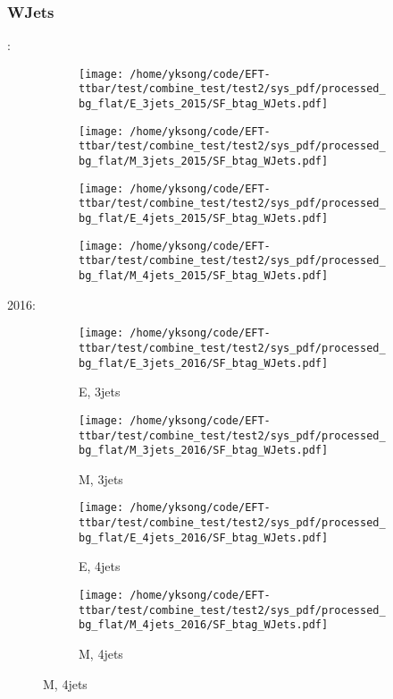 \documentclass{beamer}
\begin{document}
\begin{frame}
\frametitle{WJets}
\fontsize{5}{1}:
\begin{figure}
\centering
\begin{subfigure}[b]{0.24\textwidth}
\texttt{[image: /home/yksong/code/EFT-ttbar/test/combine\_test/test2/sys\_pdf/processed\_bg\_flat/E\_3jets\_2015/SF\_btag\_WJets.pdf]}
\end{subfigure}
\begin{subfigure}[b]{0.24\textwidth}
\texttt{[image: /home/yksong/code/EFT-ttbar/test/combine\_test/test2/sys\_pdf/processed\_bg\_flat/M\_3jets\_2015/SF\_btag\_WJets.pdf]}
\end{subfigure}
\begin{subfigure}[b]{0.24\textwidth}
\texttt{[image: /home/yksong/code/EFT-ttbar/test/combine\_test/test2/sys\_pdf/processed\_bg\_flat/E\_4jets\_2015/SF\_btag\_WJets.pdf]}
\end{subfigure}
\begin{subfigure}[b]{0.24\textwidth}
\texttt{[image: /home/yksong/code/EFT-ttbar/test/combine\_test/test2/sys\_pdf/processed\_bg\_flat/M\_4jets\_2015/SF\_btag\_WJets.pdf]}
\end{subfigure}
\end{figure}
2016:
\begin{figure}
\centering
\begin{subfigure}[b]{0.24\textwidth}
\texttt{[image: /home/yksong/code/EFT-ttbar/test/combine\_test/test2/sys\_pdf/processed\_bg\_flat/E\_3jets\_2016/SF\_btag\_WJets.pdf]}
\captionsetup{font=tiny}
\caption{E, 3jets}
\end{subfigure}
\begin{subfigure}[b]{0.24\textwidth}
\texttt{[image: /home/yksong/code/EFT-ttbar/test/combine\_test/test2/sys\_pdf/processed\_bg\_flat/M\_3jets\_2016/SF\_btag\_WJets.pdf]}
\captionsetup{font=tiny}
\caption{M, 3jets}
\end{subfigure}
\begin{subfigure}[b]{0.24\textwidth}
\texttt{[image: /home/yksong/code/EFT-ttbar/test/combine\_test/test2/sys\_pdf/processed\_bg\_flat/E\_4jets\_2016/SF\_btag\_WJets.pdf]}
\captionsetup{font=tiny}
\caption{E, 4jets}
\end{subfigure}
\begin{subfigure}[b]{0.24\textwidth}
\texttt{[image: /home/yksong/code/EFT-ttbar/test/combine\_test/test2/sys\_pdf/processed\_bg\_flat/M\_4jets\_2016/SF\_btag\_WJets.pdf]}
\captionsetup{font=tiny}
\caption{M, 4jets}
\end{subfigure}
\end{figure}
\end{frame}
\end{document}
